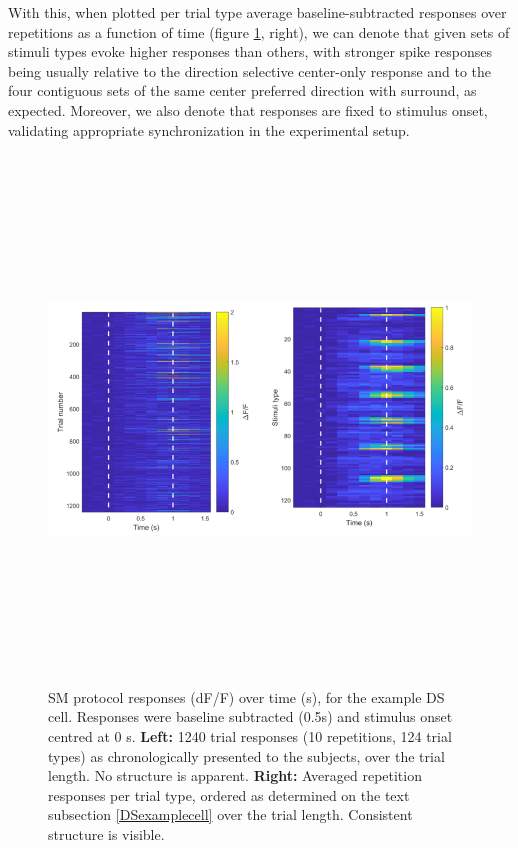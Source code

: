 With this, when plotted per trial type average baseline-subtracted responses over repetitions as a function of time (figure \ref{individualDStrials}, right), we can denote that given sets of stimuli types evoke higher responses than others, with stronger spike responses being usually relative to the direction selective center-only response and to the four contiguous sets of the same center preferred direction with surround, as expected. Moreover, we also denote that responses are fixed to stimulus onset, validating appropriate synchronization in the experimental setup.

\begin{figure}[H] \centering \includegraphics[width=14cm,height=14cm,keepaspectratio]{Figures/7.Results/individualSM/roi_29_mf379_pos5/roi29.png} 
\caption{SM protocol responses (dF/F) over time (s), for the example DS cell. Responses were baseline subtracted (0.5s) and stimulus onset centred at 0 s.
\newline \textbf{Left:} 1240 trial responses (10 repetitions, 124 trial types) as chronologically presented to the subjects, over the trial length. No structure is apparent.
\newline \textbf{Right:} Averaged repetition responses per trial type, ordered as determined on the text subsection \ref{DSexamplecell} over the trial length. Consistent structure is visible.}
\label{individualDStrials}
\end{figure}

